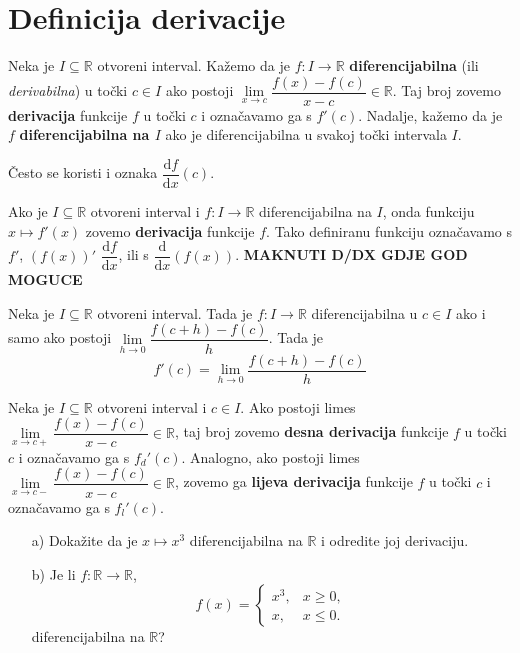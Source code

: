 \section{Definicija derivacije}
\begin{definition}
Neka je $I\subseteq \mathbb{R}$ otvoreni interval. Kažemo da je $f : I\to \mathbb{R}$ \textbf{diferencijabilna} (ili \textit{derivabilna}) u točki $c\in I$ ako postoji $\lim\limits_{x\to c}{\dfrac{f(x)-f(c)}{x-c}}\in \mathbb{R}$. Taj broj zovemo \textbf{derivacija} funkcije $f$ u točki $c$ i označavamo ga s $f'(c)$. Nadalje, kažemo da je $f$ \textbf{diferencijabilna na $I$} ako je diferencijabilna u svakoj točki intervala $I$.
\end{definition}
Često se koristi i oznaka $\dfrac{\mathrm{d}f}{\mathrm{d}x}(c)$.

Ako je $I\subseteq \mathbb{R}$ otvoreni interval i $f : I\to \mathbb{R}$ diferencijabilna na $I$, onda funkciju $x\mapsto f'(x)$ zovemo \textbf{derivacija} funkcije $f$. Tako definiranu funkciju označavamo s $f'$, $\left(f(x)\right)'$ $\dfrac{\mathrm{d}f}{\mathrm{d}x}$, ili s $\dfrac{\mathrm{d}}{\mathrm{d}x}\left(f(x)\right)$.
\textbf{MAKNUTI D/DX GDJE GOD MOGUCE}
\begin{remark}
Neka je $I\subseteq \mathbb{R}$ otvoreni interval. Tada je $f : I\to \mathbb{R}$ diferencijabilna u $c\in I$ ako i samo ako postoji $\lim\limits_{h\to 0}{\dfrac{f(c+h)-f(c)}{h}}$. Tada je
$$f'(c)=\lim\limits_{h\to 0}{\dfrac{f(c+h)-f(c)}{h}}$$
\end{remark}
\begin{definition} Neka je $I\subseteq \mathbb{R}$ otvoreni interval i $c\in I$. Ako postoji limes $\lim\limits_ {x\to c+}{\dfrac{f(x)-f(c)}{x-c}}\in \mathbb{R}$, taj broj zovemo \textbf{desna derivacija} funkcije $f$ u točki $c$ i označavamo ga s $f_d'(c)$. Analogno, ako postoji limes $\lim\limits_ {x\to c-}{\dfrac{f(x)-f(c)}{x-c}}\in \mathbb{R}$, zovemo ga \textbf{lijeva derivacija} funkcije $f$ u točki $c$ i označavamo ga s $f_l'(c)$.
\end{definition}
\begin{exercise} \textbf{}
\label{firstder}
\begin{itemize}
\item[a)] Dokažite da je $x\mapsto x^3$ diferencijabilna na $\mathbb{R}$ i odredite joj derivaciju.
\item[b)] Je li $f : \mathbb{R}\to \mathbb{R}$,
$$f(x)=\begin{cases}
x^3, & x\geq 0,\\
x, & x\leq 0.
\end{cases}$$
diferencijabilna na $\mathbb{R}$?
\end{itemize}
\end{exercise}

